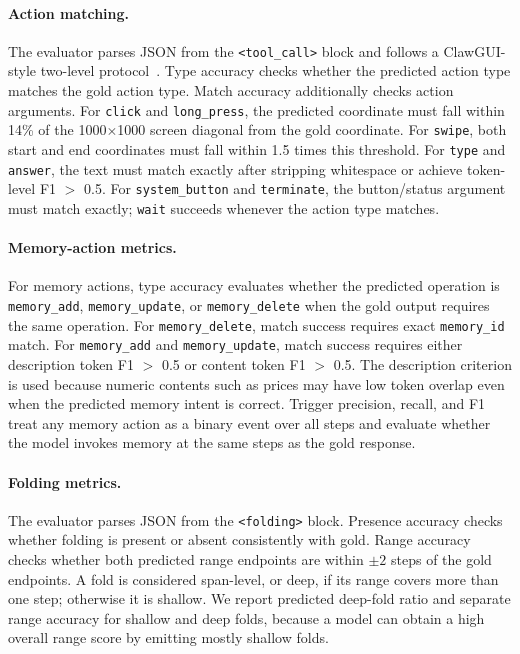 \documentclass{llmxive}
\begin{document}
\paragraph{Action matching.}
The evaluator parses JSON from the \texttt{<tool\_call>} block and follows a ClawGUI-style two-level protocol~\cite{tang2026clawgui}. Type accuracy checks whether the predicted action type matches the gold action type. Match accuracy additionally checks action arguments. For \texttt{click} and \texttt{long\_press}, the predicted coordinate must fall within 14\% of the 1000$\times$1000 screen diagonal from the gold coordinate. For \texttt{swipe}, both start and end coordinates must fall within 1.5 times this threshold. For \texttt{type} and \texttt{answer}, the text must match exactly after stripping whitespace or achieve token-level F1 $>$ 0.5. For \texttt{system\_button} and \texttt{terminate}, the button/status argument must match exactly; \texttt{wait} succeeds whenever the action type matches.

\paragraph{Memory-action metrics.}
For memory actions, type accuracy evaluates whether the predicted operation is \texttt{memory\_add}, \texttt{memory\_update}, or \texttt{memory\_delete} when the gold output requires the same operation. For \texttt{memory\_delete}, match success requires exact \texttt{memory\_id} match. For \texttt{memory\_add} and \texttt{memory\_update}, match success requires either description token F1 $>$ 0.5 or content token F1 $>$ 0.5. The description criterion is used because numeric contents such as prices may have low token overlap even when the predicted memory intent is correct. Trigger precision, recall, and F1 treat any memory action as a binary event over all steps and evaluate whether the model invokes memory at the same steps as the gold response.

\paragraph{Folding metrics.}
The evaluator parses JSON from the \texttt{<folding>} block. Presence accuracy checks whether folding is present or absent consistently with gold. Range accuracy checks whether both predicted range endpoints are within $\pm2$ steps of the gold endpoints. A fold is considered span-level, or deep, if its range covers more than one step; otherwise it is shallow. We report predicted deep-fold ratio and separate range accuracy for shallow and deep folds, because a model can obtain a high overall range score by emitting mostly shallow folds.
\end{document}
